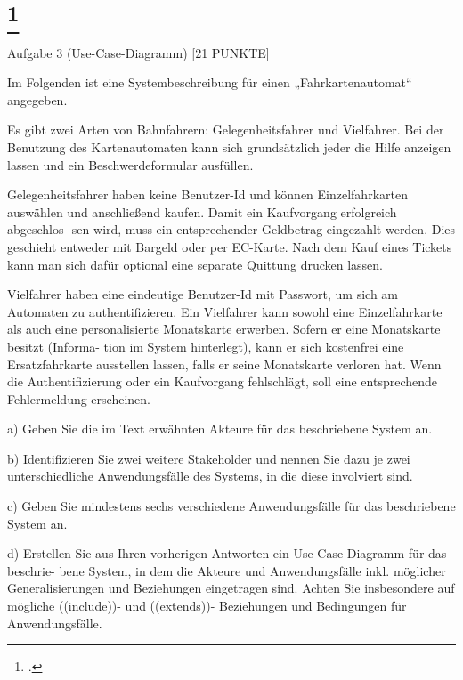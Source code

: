 \documentclass{lehramt-informatik-aufgabe}
\begin{document}
\liAufgabenTitel{}
\section{
\footcite{66116:2020:09}}

Aufgabe 3 (Use-Case-Diagramm) [21 PUNKTE]

Im Folgenden ist eine Systembeschreibung für einen „Fahrkartenautomat“ angegeben.

Es gibt zwei Arten von Bahnfahrern: Gelegenheitsfahrer und Vielfahrer. Bei der
Benutzung des Kartenautomaten kann sich grundsätzlich jeder die Hilfe anzeigen
lassen und ein Beschwerdeformular ausfüllen.

Gelegenheitsfahrer haben keine Benutzer-Id und können Einzelfahrkarten
auswählen und anschließend kaufen. Damit ein Kaufvorgang erfolgreich abgeschlos-
sen wird, muss ein entsprechender Geldbetrag eingezahlt werden. Dies geschieht
entweder mit Bargeld oder per EC-Karte. Nach dem Kauf eines Tickets kann man
sich dafür optional eine separate Quittung drucken lassen.

Vielfahrer haben eine eindeutige Benutzer-Id mit Passwort, um sich am Automaten
zu authentifizieren. Ein Vielfahrer kann sowohl eine Einzelfahrkarte als auch eine
personalisierte Monatskarte erwerben. Sofern er eine Monatskarte besitzt (Informa-
tion im System hinterlegt), kann er sich kostenfrei eine Ersatzfahrkarte ausstellen
lassen, falls er seine Monatskarte verloren hat. Wenn die Authentifizierung oder ein
Kaufvorgang fehlschlägt, soll eine entsprechende Fehlermeldung erscheinen.

a) Geben Sie die im Text erwähnten Akteure für das beschriebene System an.

b) Identifizieren Sie zwei weitere Stakeholder und nennen Sie dazu je zwei unterschiedliche
Anwendungsfälle des Systems, in die diese involviert sind.

c) Geben Sie mindestens sechs verschiedene Anwendungsfälle für das beschriebene System an.

d) Erstellen Sie aus Ihren vorherigen Antworten ein Use-Case-Diagramm für das beschrie-
bene System, in dem die Akteure und Anwendungsfälle inkl. möglicher Generalisierungen
und Beziehungen eingetragen sind. Achten Sie insbesondere auf mögliche ((include))- und
((extends))- Beziehungen und Bedingungen für Anwendungsfälle.
\end{document}
